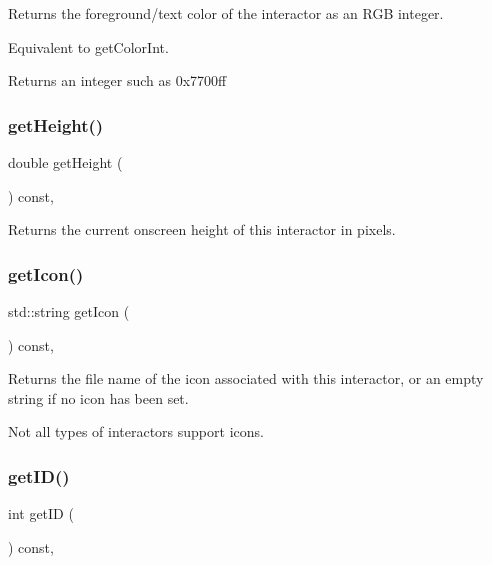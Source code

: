 Returns the foreground/text color of the interactor as an R\+GB integer. 

Equivalent to get\+Color\+Int. \begin{DoxyReturn}{Returns}
an integer such as 0x7700ff 
\end{DoxyReturn}
\mbox{\label{classGInteractor_a1e7e353362434072875264cf95629f99}} 
\subsubsection{\texorpdfstring{get\+Height()}{getHeight()}}
{\footnotesize\ttfamily double get\+Height (\begin{DoxyParamCaption}{ }\end{DoxyParamCaption}) const\hspace{0.3cm}{\ttfamily [virtual]}, {\ttfamily [inherited]}}



Returns the current onscreen height of this interactor in pixels. 

\mbox{\label{classGInteractor_aaed62a73004939a64da6f0eb9eb64d73}} 
\subsubsection{\texorpdfstring{get\+Icon()}{getIcon()}}
{\footnotesize\ttfamily std\+::string get\+Icon (\begin{DoxyParamCaption}{ }\end{DoxyParamCaption}) const\hspace{0.3cm}{\ttfamily [virtual]}, {\ttfamily [inherited]}}



Returns the file name of the icon associated with this interactor, or an empty string if no icon has been set. 

Not all types of interactors support icons. \mbox{\label{classGInteractor_a9c9659a6c6ba66b4107ba59c95a24241}} 
\subsubsection{\texorpdfstring{get\+I\+D()}{getID()}}
{\footnotesize\ttfamily int get\+ID (\begin{DoxyParamCaption}{ }\end{DoxyParamCaption}) const\hspace{0.3cm}{\ttfamily [virtual]}, {\ttfamily [inherited]}}



